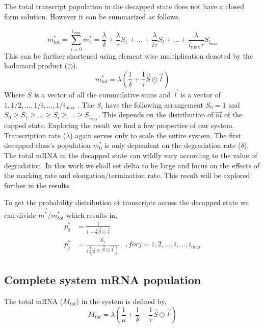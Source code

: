 \documentclass[review]{elsarticle}
\newcommand{\imax}{\ensuremath{{i_{\max}}}\xspace}
\begin{document}
The total transcript population in the decapped state does not have a closed form solution. However it can be summarized as follows,

\begin{equation}
	m_{tot}^{*} = \sum_{i=0}^{\imax} m_{i}^{*} = \frac{\lambda}{\delta} + \frac{\lambda}{\tau}S_{1} + \hdots + \frac{\lambda}{i \tau}S_{i} + \hdots  + \frac{\lambda}{\imax \tau}S_{\imax} 
\end{equation}
This can be further shortened using element wise multiplication denoted by the hadamard product ($\odot$).
\begin{equation}  
	m_{tot}^{*} = \lambda(\frac{1}{\delta} + \frac{1}{\tau}\vec{S} \odot \vec{l}	) 
\end{equation}
Where $\vec{S}$ is a vector of all the cummulative sums and $\vec{l}$ is a vector of $1,1/2,...,1/i,...,1/\imax$ . The $S_{i}$ have the following arrangement $S_{0}=1$ and $ S_{0} \ge S_{1} \ge ... \ge S_{i} \ge ... \ge S_{\imax}$. This depends on the distribution of $\vec{m}$ of the capped state. Exploring the result we find a few properties of our system. Transcription rate ($\lambda$) again serves only to scale the entire system. The first decapped class's population $m_{0}^{*}$ is only dependent on the degradation rate ($\delta$). The total mRNA in the decapped state can wildly vary according to the value of degradation. In this work we shall set delta to be large and focus on the effects of the marking rate and elongation/termination rate. This result will be explored further in the results.

To get the probability distribution of transcripts across the decapped state we can divide $\vec{m^{*}}/m_{tot}^{*}$ which results in,
\begin{align*}
	p_{0}^{*} &= \frac{1}{1 + \frac{\delta}{\tau}\vec{S} \odot \vec{l}}	\\
  	p_{j}^{*} &= \frac{S_{j}}{j(\frac{\tau}{\delta} + \vec{S} \odot \vec{l})}	\:\:\:\:, for j=1, 2, ..., i, ..., \imax
\end{align*}






\subsection{Complete system mRNA population}
The total mRNA ($M_{tot}$) in the system is defined by,
\begin{equation}
	M_{tot} = \lambda(\frac{1}{\mu} + \frac{1}{\delta} + \frac{1}{\tau}\vec{S} \odot \vec{l}	) 
\end{equation}
\end{document}
